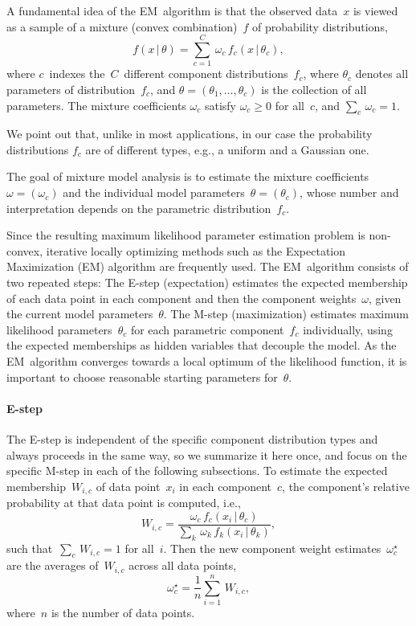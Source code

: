 \documentclass{article}
\newcommand{\given}{\,|\,}
\newcommand{\params}{\theta}
\newcommand{\as}{\star}
\begin{document}
A fundamental idea of the EM~algorithm is that the observed data~$x$ is viewed as a sample of a mixture (convex combination)~$f$ of probability distributions,
\[ f(x \given \params) = \sum_{c=1}^C\, \omega_c\, f_c(x \given \params_c), \]
where $c$~indexes the~$C$~different component distributions~$f_c$, where $\params_c$ denotes all parameters of distribution~$f_c$, and $\params=(\params_1, \dots, \params_c)$ is the collection of all parameters.
The mixture coefficients $\omega_c$ satisfy $\omega_c\geq 0$ for all~$c$, and $\sum_{c}\, \omega_c = 1$.

We point out that, unlike in most applications, in our case the probability distributions $f_c$ are of different types, e.g., a uniform and a Gaussian one.

The goal of mixture model analysis is to estimate the mixture coefficients~$\omega = (\omega_c)$ and the individual model parameters~$\params = (\params_c)$, whose number and interpretation depends on the parametric distribution~$f_c$.

Since the resulting maximum likelihood parameter estimation problem is non-convex, iterative locally optimizing methods such as the Expectation Maximization (EM) algorithm are frequently used.
The EM~algorithm consists of two repeated steps:
The E-step (expectation) estimates the expected membership of each data point in each component and then the component weights~$\omega$, given the current model parameters~$\params$.
The M-step (maximization) estimates maximum likelihood parameters~$\params_c$ for each parametric component~$f_c$ individually, using the expected memberships as hidden variables that decouple the model.
As the EM~algorithm converges towards a local optimum of the likelihood function, it is important to choose reasonable starting parameters for~$\theta$.

\paragraph{E-step}
The E-step is independent of the specific component distribution types and always proceeds in the same way, so we summarize it here once, and focus on the specific M-step in each of the following subsections.
To estimate the expected membership~$W_{i,c}$ of data point~$x_i$ in each component~$c$, the component's relative probability at that data point is computed, i.e.,
\begin{equation}
  W_{i,c} = \frac{\omega_c\, f_c(x_i \given \params_c)}{\sum_{k}\, \omega_k\, f_k(x_i \given \params_k)},
\label{eq:Estep}
\end{equation}
such that~$\sum_c\, W_{i,c} = 1$ for all~$i$.
Then the new component weight estimates~$\omega^{\as}_c$ are the averages of~$W_{i,c}$ across all data points,
\begin{equation}
  \omega^{\as}_c = \frac{1}{n} \sum_{i=1}^n\, W_{i,c},
\label{eq:weights}  
\end{equation}
where~$n$ is the number of data points.
\end{document}
